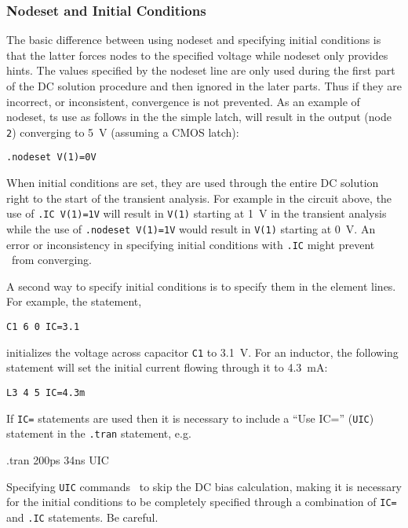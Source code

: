 \subsubsection{Nodeset and Initial Conditions}

The basic difference between using nodeset and specifying initial conditions
is that the latter forces nodes to the specified voltage while
nodeset only provides hints.
The values
specified by the nodeset line are only used during the first
part of the DC solution
procedure and then ignored in the later parts.  Thus if they are incorrect,
or inconsistent, convergence is not prevented.
As an example of nodeset, ts use as follows in the the simple latch,
will result in the output (node {\tt 2})
converging to 5~V (assuming a CMOS latch):
\par\noindent
\centerline{}
\par\noindent
\begin{center}
{\tt .nodeset V(1)=0V}
\end{center}
\vspace{3mm}

When initial conditions are set, they are used through the entire DC solution
right to the start of the transient analysis.
For example in the circuit above, the use of
{\tt .IC V(1)=1V} will result
in {\tt V(1)} starting at 1~V in the transient analysis while
the use of {\tt .nodeset V(1)=1V} would result in  {\tt V(1)} starting
at 0~V.
An error or inconsistency in specifying initial conditions with {\tt .IC} might
prevent \spice\ from converging.

A second way to specify initial conditions is to specify them in
the element lines.  For example, the statement,
\begin{center}
{\tt C1 6 0 IC=3.1}
\end{center}
initializes the voltage across capacitor {\tt C1} to 3.1~V.  For an inductor,
the following statement will set the initial current flowing through it to
4.3~mA:
\begin{center}
{\tt L3 4 5 IC=4.3m}
\end{center}
If {\tt IC=} statements are used then it is necessary to include a ``Use IC=''
({\tt UIC}) statement in the {\tt .tran} statement, e.g.
\begin{center}
.tran  200ps 34ns UIC
\end{center}
Specifying {\tt UIC} commands \spice\ to skip the
DC bias calculation, making it is necessary
for the initial conditions to be completely specified through a combination
of {\tt IC=} and {\tt .IC} statements.  Be careful.

